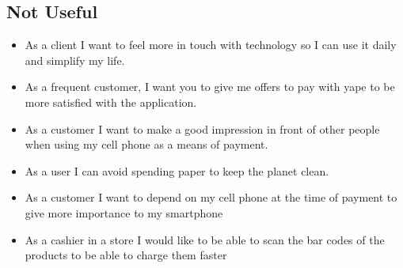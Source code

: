\documentclass{article}
\begin{document}
\subsection{Not Useful}
\begin{itemize}
\item As a client I want to feel more in touch with technology so I can use it daily and simplify my life.
\item As a frequent customer, I want you to give me offers to pay with yape to be more satisfied with the application.
\item As a customer I want to make a good impression in front of other people when using my cell phone as a means of payment.
\item As a user I can avoid spending paper to keep the planet clean.
\item As a customer I want to depend on my cell phone at the time of payment to give more importance to my smartphone
\item As a cashier in a store I would like to be able to scan the bar codes of the products to be able to charge them faster







\end{itemize}
\end{document}
